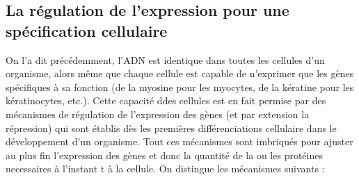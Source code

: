 \subsection{La régulation de l'expression pour une spécification cellulaire}

On l'a dit précédemment, l'ADN est identique dans toutes les cellules d'un organisme, alors même que chaque cellule est capable de n'exprimer que les gènes spécifiques à sa fonction (de la myosine pour les myocytes, de la kératine pour les kératinocytes, etc.). Cette capacité ddes cellules est en fait permise par des mécanismes de régulation de l'expression des gènes (et par extension la répression) qui sont établis dès les premières différenciations cellulaire dans le développement d'un organisme. Tout ces mécanismes sont imbriqués pour ajuster au plus fin l'expression des gènes et donc la quantité de la ou les protéines necessaires à l'instant t à la cellule. On distingue les mécanismes suivants : 
